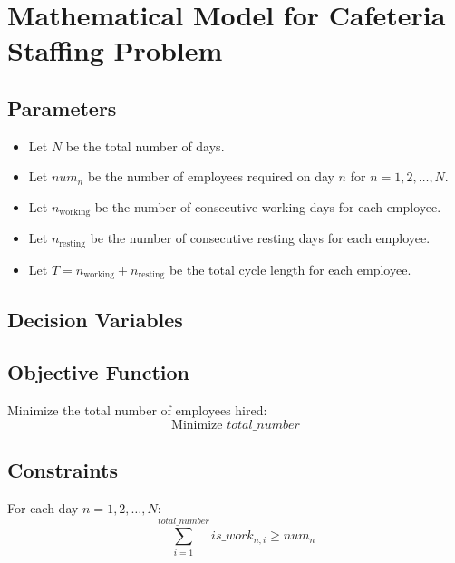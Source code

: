 \documentclass{article}
\begin{document}
\section*{Mathematical Model for Cafeteria Staffing Problem}

\subsection*{Parameters}
\begin{itemize}
    \item Let \( N \) be the total number of days.
    \item Let \( num_n \) be the number of employees required on day \( n \) for \( n = 1, 2, \ldots, N \).
    \item Let \( n_{\text{working}} \) be the number of consecutive working days for each employee.
    \item Let \( n_{\text{resting}} \) be the number of consecutive resting days for each employee.
    \item Let \( T = n_{\text{working}} + n_{\text{resting}} \) be the total cycle length for each employee.
\end{itemize}

\subsection*{Decision Variables}

\subsection*{Objective Function}
Minimize the total number of employees hired:
\[
\text{Minimize } total\_number
\]

\subsection*{Constraints}
For each day \( n = 1, 2, \ldots, N \):
\[
\sum_{i=1}^{total\_number} is\_work_{n, i} \geq num_n
\]
\end{document}
